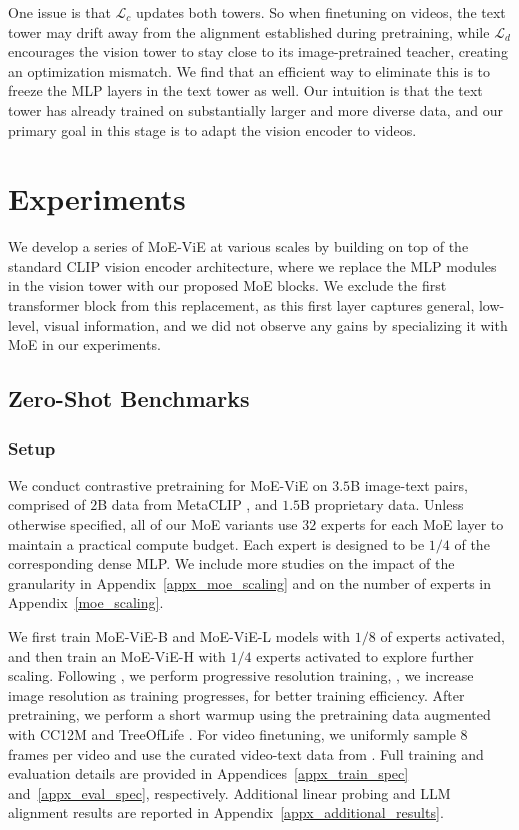 \documentclass[runningheads]{llncs}
\begin{document}
One issue is that $\mathcal{L}_c$ updates both towers. So when finetuning on videos, the text tower may drift away from the alignment established during pretraining, while $\mathcal{L}_d$ encourages the vision tower to stay close to its image-pretrained teacher, creating an optimization mismatch. We find that an efficient way to eliminate this is to freeze the MLP layers in the text tower as well. Our intuition is that the text tower has already trained on substantially larger and more diverse data, and our primary goal in this stage is to adapt the vision encoder to videos. 

\section{Experiments}

We develop a series of MoE-ViE at various scales by building on top of the standard CLIP vision encoder architecture, where we replace the MLP modules in the vision tower with our proposed MoE blocks. We exclude the first transformer block from this replacement, as this first layer captures general, low-level, visual information, and we did not observe any gains by specializing it with MoE in our experiments. 

\subsection{Zero-Shot Benchmarks}
\label{main_results}

\subsubsection{Setup} We conduct contrastive pretraining for MoE-ViE on $3.5$B image-text pairs, comprised of $2$B data from MetaCLIP \cite{metaclip}, and $1.5$B proprietary data. Unless otherwise specified, all of our MoE variants use $32$ experts for each MoE layer to maintain a practical compute budget. Each expert is designed to be $1/4$ of the corresponding dense MLP. We include more studies on the impact of the granularity in Appendix~\ref{appx_moe_scaling} and on the number of experts in Appendix~\ref{moe_scaling}.

We first train MoE-ViE-B and MoE-ViE-L models with $1/8$ of experts activated, and then train an MoE-ViE-H with $1/4$ experts activated to explore further scaling. Following \cite{pe}, we perform progressive resolution training, \ie, we increase image resolution as training progresses, for better training efficiency. After pretraining, we perform a short warmup using the pretraining data augmented with CC12M \cite{cc12m} and TreeOfLife \cite{treeoflife}. For video finetuning, we uniformly sample 8 frames per video and use the curated video-text data from \cite{pe,merlot}. Full training and evaluation details are provided in Appendices~\ref{appx_train_spec} and~\ref{appx_eval_spec}, respectively. Additional linear probing and LLM alignment results are reported in Appendix~\ref{appx_additional_results}.
\end{document}
